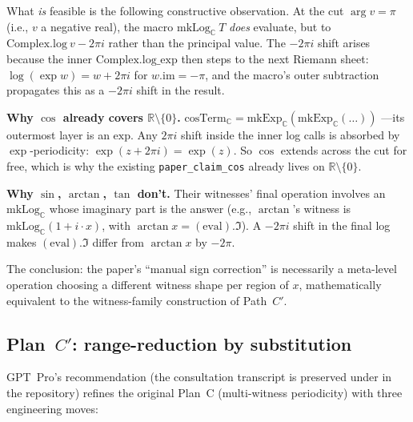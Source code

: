 \documentclass[11pt,a4paper]{article}
\theoremstyle{plain}
\theoremstyle{definition}
\begin{document}
What \emph{is} feasible is the following constructive observation. At
the cut $\arg v = \pi$ (i.e., $v$ a negative real), the macro
$\mathrm{mkLog}_{\mathbb{C}}\ T$ \emph{does} evaluate, but to
$\mathrm{Complex.log}\ v - 2\pi i$ rather than the principal value.
The $-2\pi i$ shift arises because the inner
$\mathrm{Complex.log\_exp}$ then steps to the next Riemann sheet:
$\log(\exp w) = w + 2\pi i$ for $w.\mathrm{im} = -\pi$, and the macro's
outer subtraction propagates this as a $-2\pi i$ shift in the result.

\textbf{Why $\cos$ already covers $\mathbb{R}\setminus\{0\}$.}
$\mathrm{cosTerm}_{\mathbb{C}} = \mathrm{mkExp}_{\mathbb{C}}(\mathrm{mkExp}_{\mathbb{C}}(\dots))$
---its outermost layer is an $\mathrm{exp}$. Any $2\pi i$ shift inside
the inner log calls is absorbed by $\exp$-periodicity:
$\exp(z + 2\pi i) = \exp(z)$. So $\cos$ extends across the cut for
free, which is why the existing \texttt{paper\_claim\_cos} already
lives on $\mathbb{R}\setminus\{0\}$.

\textbf{Why $\sin$, $\arctan$, $\tan$ don't.} Their witnesses' final
operation involves an $\mathrm{mkLog}_{\mathbb{C}}$ whose imaginary
part is the answer (e.g., $\arctan$'s witness is
$\mathrm{mkLog}_{\mathbb{C}}(1 + i \cdot x)$, with
$\arctan x = (\mathrm{eval}).\Im$). A $-2\pi i$ shift in the final
log makes $(\mathrm{eval}).\Im$ differ from $\arctan x$ by $-2\pi$.

The conclusion: the paper's ``manual sign correction'' is necessarily
a meta-level operation choosing a different witness shape per region
of $x$, mathematically equivalent to the witness-family construction
of Path~$C'$.

\subsection{\texorpdfstring{Plan~$C'$}{Plan C'}: range-reduction by substitution}

GPT~Pro's recommendation (the consultation transcript is preserved
under  in the repository) refines
the original Plan~C (multi-witness periodicity) with three engineering
moves:
\end{document}
